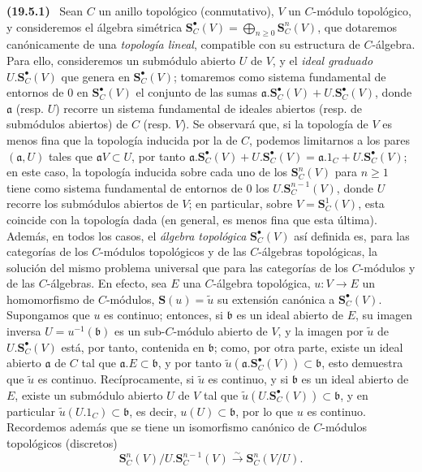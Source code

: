 \documentclass[10pt,oneside]{book}
\makeatletter
\newcommand{\setmanualcurrentlabel}[1]{\def\@currentlabel{#1}}
\newcommand{\oldpage}[2][]{%
  \setcounter{footnote}{0}%
  \marginpar{\scriptsize\textbf{#1}~|~#2}\ignorespaces}
\newenvironment{env}[1][]{\setmanualcurrentlabel{#1}\par\medskip\noindent\textbf{(#1)}\ }{\par}
\makeatother
\begin{document}
\begin{env}[19.5.1]
\label{0.19.5.1-es}
\oldpage[0\textsubscript{IV-1}]{90}
Sean $C$ un anillo topológico (conmutativo), $V$ un $C$-módulo topológico,
y consideremos el álgebra simétrica
$\mathbf S_C^\bullet(V)=\bigoplus_{n\geq0}\mathbf S_C^n(V)$, que dotaremos
canónicamente de una \emph{topología lineal}, compatible con su estructura de
$C$-álgebra. Para ello, consideremos un submódulo abierto $U$ de $V$, y
el \emph{ideal graduado} $U.\mathbf S_C^\bullet(V)$ que genera en
$\mathbf S_C^\bullet(V)$; tomaremos como sistema fundamental de entornos de
$0$ en $\mathbf S_C^\bullet(V)$ el conjunto de las sumas
$\mathfrak a.\mathbf S_C^\bullet(V)+U.\mathbf S_C^\bullet(V)$, donde $\mathfrak a$ (resp.
$U$) recorre un sistema fundamental de ideales abiertos (resp. de submódulos
abiertos) de $C$ (resp. $V$). Se observará que, si la topología de $V$ es menos
fina que la topología inducida por la de $C$, podemos limitarnos a los pares
$(\mathfrak a,U)$ tales que $\mathfrak aV\subset U$, por tanto
$\mathfrak a.\mathbf S_C^\bullet(V)+U.\mathbf S_C^\bullet(V)
=\mathfrak a.1_C+U.\mathbf S_C^\bullet(V)$; en este caso, la topología inducida sobre
cada uno de los $\mathbf S_C^n(V)$ para $n\geq1$ tiene como sistema fundamental de
entornos de $0$ los $U.\mathbf S_C^{n-1}(V)$, donde $U$ recorre los
submódulos abiertos de $V$; en particular, sobre $V=\mathbf S_C^1(V)$, esta
coincide con la topología dada (en general, es menos fina que esta
última). Además, en todos los casos, el \emph{álgebra topológica}
$\mathbf S_C^\bullet(V)$ así definida es, para las categorías de los $C$-módulos
topológicos y de las $C$-álgebras topológicas, la solución del mismo problema
universal que para las categorías de los $C$-módulos y de las $C$-álgebras. En efecto,
sea $E$ una $C$-álgebra topológica, $u:V\to E$ un homomorfismo de
$C$-módulos, $\mathbf S(u)=\widetilde u$ su extensión canónica a
$\mathbf S_C^\bullet(V)$. Supongamos que $u$ es continuo; entonces, si $\mathfrak b$ es un
ideal abierto de $E$, su imagen inversa $U=u^{-1}(\mathfrak b)$ es un
sub-$C$-módulo abierto de $V$, y la imagen por $\widetilde u$ de
$U.\mathbf S_C^\bullet(V)$ está, por tanto, contenida en $\mathfrak b$; como, por otra parte,
existe un ideal abierto $\mathfrak a$ de $C$ tal que
$\mathfrak a.E\subset\mathfrak b$, y por tanto
$\widetilde u(\mathfrak a.\mathbf S_C^\bullet(V))\subset\mathfrak b$, esto demuestra
que $\widetilde u$ es continuo. Recíprocamente, si $\widetilde u$ es continuo,
y si $\mathfrak b$ es un ideal abierto de $E$, existe un submódulo abierto
$U$ de $V$ tal que $\widetilde u(U.\mathbf S_C^\bullet(V))\subset\mathfrak b$, y en
particular $\widetilde u(U.1_C)\subset\mathfrak b$, es decir,
$u(U)\subset\mathfrak b$, por lo que $u$ es continuo. Recordemos además que se tiene
un isomorfismo canónico de $C$-módulos topológicos (discretos)
\begin{equation}
\label{0.19.5.1.1-es}
  \mathbf S_C^n(V)/U.\mathbf S_C^{n-1}(V)
  \xrightarrow{\sim}\mathbf S_C^n(V/U).
  \tag{19.5.1.1}
\end{equation}
\end{env}
\end{document}
